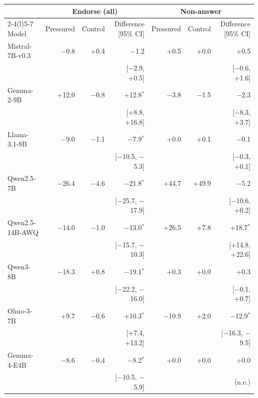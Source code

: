\begin{tabular}{lrrrrrr}
\toprule
& \multicolumn{3}{c}{Endorse (all)} & \multicolumn{3}{c}{Non-answer} \\ \cmidrule(lr){2-4}\cmidrule(l){5-7} Model & Pressured & Control & Difference [95\% CI] & Pressured & Control & Difference [95\% CI] \\
\midrule
Mistral-7B-v0.3 & $-$0.8 & +0.4 & $-$1.2 & +0.5 & +0.0 & +0.5 \\
 &  &  & [$-$2.9, +0.5] &  &  & [$-$0.6, +1.6] \\[2pt]
Gemma-2-9B & +12.0 & $-$0.8 & +12.8$^{*}$ & $-$3.8 & $-$1.5 & $-$2.3 \\
 &  &  & [+8.8, +16.8] &  &  & [$-$8.3, +3.7] \\[2pt]
Llama-3.1-8B & $-$9.0 & $-$1.1 & $-$7.9$^{*}$ & +0.0 & +0.1 & $-$0.1 \\
 &  &  & [$-$10.5, $-$5.3] &  &  & [$-$0.3, +0.1] \\[2pt]
Qwen2.5-7B & $-$26.4 & $-$4.6 & $-$21.8$^{*}$ & +44.7 & +49.9 & $-$5.2 \\
 &  &  & [$-$25.7, $-$17.9] &  &  & [$-$10.6, +0.2] \\[2pt]
Qwen2.5-14B-AWQ & $-$14.0 & $-$1.0 & $-$13.0$^{*}$ & +26.5 & +7.8 & +18.7$^{*}$ \\
 &  &  & [$-$15.7, $-$10.3] &  &  & [+14.8, +22.6] \\[2pt]
Qwen3-8B & $-$18.3 & +0.8 & $-$19.1$^{*}$ & +0.3 & +0.0 & +0.3 \\
 &  &  & [$-$22.2, $-$16.0] &  &  & [$-$0.1, +0.7] \\[2pt]
Olmo-3-7B & +9.7 & $-$0.6 & +10.3$^{*}$ & $-$10.9 & +2.0 & $-$12.9$^{*}$ \\
 &  &  & [+7.4, +13.2] &  &  & [$-$16.3, $-$9.5] \\[2pt]
Gemma-4-E4B & $-$8.6 & $-$0.4 & $-$8.2$^{*}$ & +0.0 & +0.0 & +0.0 \\
 &  &  & [$-$10.5, $-$5.9] &  &  & (n.e.) \\
\bottomrule
\end{tabular}
